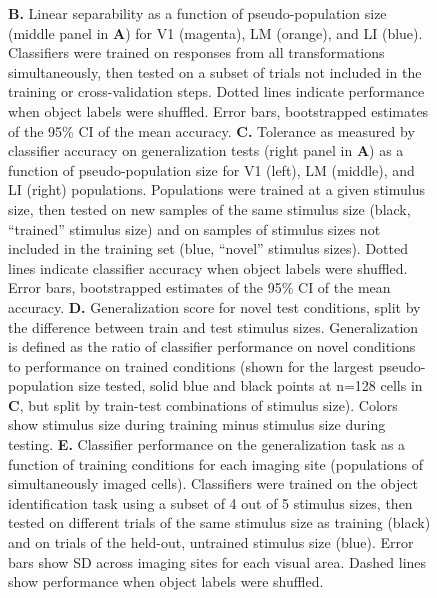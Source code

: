 \begin{figure}[t!]
{    \textbf{B.} Linear separability as a function of pseudo-population size (middle panel in \textbf{A}) for V1 (magenta), LM (orange), and LI (blue). Classifiers were trained on responses from all transformations simultaneously, then tested on a subset of trials not included in the training or cross-validation steps. Dotted lines indicate performance when object labels were shuffled. Error bars, bootstrapped estimates of the 95\% CI of the mean accuracy. 
    \textbf{C.} Tolerance as measured by classifier accuracy on generalization tests (right panel in \textbf{A}) as a function of pseudo-population size for V1 (left), LM (middle), and LI (right) populations. Populations were trained at a given stimulus size, then tested on new samples of the same stimulus size (black, “trained” stimulus size) and on samples of stimulus sizes not included in the training set (blue, “novel” stimulus sizes). Dotted lines indicate classifier accuracy when object labels were shuffled. Error bars, bootstrapped estimates of the 95\% CI of the mean accuracy.
    \textbf{D.} Generalization score for novel test conditions, split by the difference between train and test stimulus sizes. Generalization is defined as the ratio of classifier performance on novel conditions to performance on trained conditions (shown for the largest pseudo-population size tested, solid blue and black points at n=128 cells in \textbf{C}, but split by train-test combinations of stimulus size). Colors show stimulus size during training minus stimulus size during testing.
    \textbf{E.} Classifier performance on the generalization task as a function of training conditions for each imaging site (populations of simultaneously imaged cells). Classifiers were trained on the object identification task using a subset of 4 out of 5 stimulus sizes, then tested on different trials of the same stimulus size as training (black) and on trials of the held-out, untrained stimulus size (blue). Error bars show SD across imaging sites for each visual area. Dashed lines show performance when object labels were shuffled. 
    \label{fig:neural_generalization}}
\end{figure}




